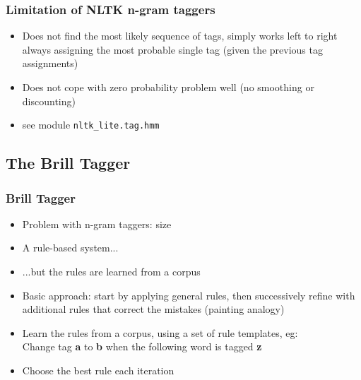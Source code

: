 \documentclass{beamer}             %
\begin{document}
\begin{frame}[fragile]
  \frametitle{Limitation of NLTK n-gram taggers}

  \begin{itemize}
  \item Does not find the most likely sequence of tags, simply works
    left to right always assigning the most probable single tag (given
    the previous tag assignments)
  \item Does not cope with zero probability problem well (no smoothing
    or discounting)
  \item see module \verb|nltk_lite.tag.hmm|
  \end{itemize}
\end{frame}

\subsection{The Brill Tagger}

\begin{frame}
  \frametitle{Brill Tagger}
  \begin{itemize}
  \item Problem with n-gram taggers: size
  \item A rule-based system...
  \item ...but the rules are learned from a corpus
  \item Basic approach: start by applying general rules, then
    successively refine with additional rules that correct the
    mistakes (painting analogy)
  \item Learn the rules from a corpus, using a set of rule templates,
    eg:\\
    Change tag \textbf{a} to \textbf{b} when the following word is
    tagged \textbf{z}
  \item Choose the best rule each iteration    
  \end{itemize}
\end{frame}
\end{document}
